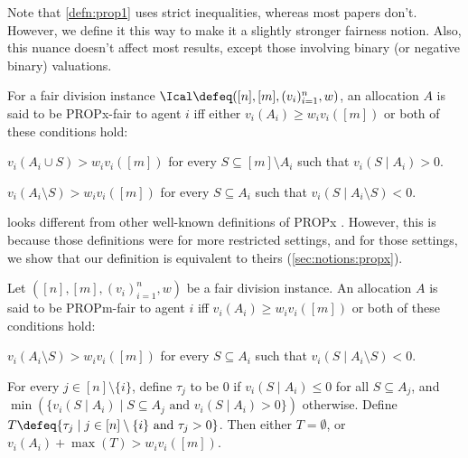 Note that \cref{defn:prop1} uses strict inequalities, whereas most papers don't.
However, we define it this way to make it a slightly stronger fairness notion.
Also, this nuance doesn't affect most results, except those involving
binary (or negative binary) valuations.

\begin{definition}
\label{defn:propx}
For a fair division instance $\Ical \defeq ([n], [m], (v_i)_{i=1}^n, w)$,
an allocation $A$ is said to be PROPx-fair to agent $i$ iff
either $v_i(A_i) \ge w_iv_i([m])$ or both of these conditions hold:
\begin{tightenum}
\item $v_i(A_i \cup S) > w_iv_i([m])$ for every $S \subseteq [m] \setminus A_i$
    such that $v_i(S \mid A_i) > 0$.
\item $v_i(A_i \setminus S) > w_iv_i([m])$ for every $S \subseteq A_i$
    such that $v_i(S \mid A_i \setminus S) < 0$.
\end{tightenum}
\end{definition}

 looks different from other well-known definitions of PROPx
\cite{aziz2020polynomial,li2022almost}.
However, this is because those definitions were for more restricted settings,
and for those settings, we show that our definition is equivalent to theirs
(\cref{sec:notions:propx}).

\begin{definition}[PROPm]
\label{defn:propm}
Let $([n], [m], (v_i)_{i=1}^n, w)$ be a fair division instance.
An allocation $A$ is said to be PROPm-fair to agent $i$ iff
$v_i(A_i) \ge w_iv_i([m])$ or both of these conditions hold:
\begin{tightenum}
\item\label{item:propm:chores}$v_i(A_i \setminus S) > w_iv_i([m])$ for every $S \subseteq A_i$
    such that $v_i(S \mid A_i \setminus S) < 0$.
\item\label{item:propm:goods}For every $j \in [n] \setminus \{i\}$, define
    $\tau_j$ to be 0 if $v_i(S \mid A_i) \le 0$ for all $S \subseteq A_j$,
    and $\min(\{v_i(S \mid A_i) \mid S \subseteq A_j \textrm{ and } v_i(S \mid A_i) > 0\})$ otherwise.
    Define $T \defeq \{\tau_j \mid j \in [n] \setminus \{i\} \textrm{ and } \tau_j > 0\}$.
    Then either $T = \emptyset$, or $v_i(A_i) + \max(T) > w_iv_i([m])$.
\end{tightenum}
\end{definition}

